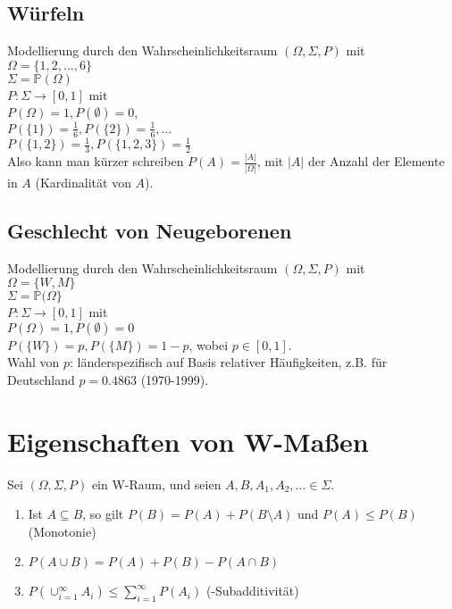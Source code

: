 \subsection{Würfeln}
Modellierung durch den Wahrscheinlichkeitsraum $(\Omega, \Sigma, P)$ mit\\
$\Omega = \{1,2,\dots,6\}$\\
$\Sigma =\mathbb{P}(\Omega)$\\
$P: \Sigma \to [0,1]$ mit\\
$P(\Omega) = 1, P(\emptyset) = 0$,\\
$P(\{1\})=\frac{1}{6}, P(\{2\})=\frac{1}{6}, \dots$\\
$P(\{1, 2\})=\frac{1}{3}, P(\{1,2,3\})=\frac{1}{2}$\\
Also kann man kürzer schreiben $P(A) = \frac{|A|}{|\Omega|}$, mit $|A|$ der Anzahl der Elemente in $A$
(Kardinalität von $A$).

\subsection{Geschlecht von Neugeborenen}
Modellierung durch den Wahrscheinlichkeitsraum $(\Omega, \Sigma, P)$ mit\\
$\Omega = \{W,M\}$\\
$\Sigma = \mathbb{P}(\Omega\}$\\
$P: \Sigma \to [0,1]$ mit\\
$P(\Omega) = 1, P(\emptyset)=0$\\
$P(\{W\}) = p, P(\{M\}) = 1-p$, wobei $p \in [0,1]$.\\
Wahl von $p$: länderspezifisch auf Basis relativer Häufigkeiten, z.B. für Deutschland $p=0.4863$ (1970-1999).

\section{Eigenschaften von W-Maßen}
\begin{theorem}
    Sei $(\Omega, \Sigma, P)$ ein W-Raum, und seien $A, B, A_1, A_2, \dots \in \Sigma$.
    \begin{enumerate}
        \item Ist $A \subseteq B$, so gilt $P(B) = P(A) + P(B\setminus A)$ und
              $P(A) \leq P(B)$ (Monotonie)
        \item $P(A \cup B) = P(A) + P(B) - P(A\cap B)$
        \item $P\left(\cup_{i=1}^\infty A_i\right) \leq \sum_{i=1}^\infty P(A_i)$ (\ts-Subadditivität)
    \end{enumerate}
\end{theorem}


